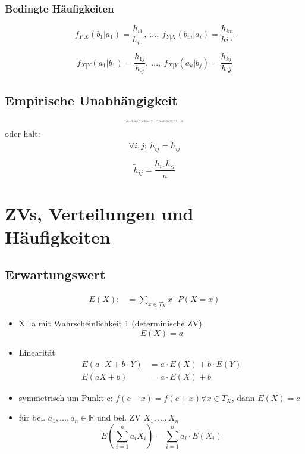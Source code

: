 \documentclass[10pt,a4paper,landscape]{article}
\begin{document}
\begin{multicols}{4}
\subsubsection*{Bedingte Häufigkeiten}

\[
f_{Y|X}(b_1|a_1)=\frac{h_{i1}}{h_{i\cdot}},~...,~ f_{Y|X}(b_m|a_i)=\frac{h_{im}}{h{i\cdot}}
\]

\[
f_{X|Y}(a_1|b_1)=\frac{h_{1j}}{h_{\cdot j}},~...,~ f_{X|Y}(a_k|b_j)=\frac{h_{kj}}{h{\cdot j}}
\]

\subsection{Empirische Unabhängigkeit}
\[ \resizebox{0.2\textwidth}{!}{$
f_{Y|X}(b_j|a_1)=f_Y(b_j|a_2)=...=f_{Y|X}(b_j|a_k)\forall j=1,...,m
$}
\]
oder halt:
\[
\forall i,j: ~ h_{ij}=\tilde{h}_{ij}
\]

\[
\tilde{h}_{ij}=\frac{h_{i \cdot} h_{\cdot j}}{n}
\]


\section{ZVs, Verteilungen und Häufigkeiten}

\subsection{Erwartungswert}
\begin{align*}
E(X) :&=\sum_{x\in T_X} x\cdot P(X=x)
\end{align*}

\begin{itemize}
\item X=a mit Wahrscheinlichkeit 1 (determinische ZV)
\[
E(X)=a
\]
\item Linearität
\begin{align*}
E(a\cdot X + b \cdot Y) &= a\cdot E(X) + b \cdot	E(Y) \\
E(aX+b) &= a\cdot E(X) + b
\end{align*}
\item symmetrisch um Punkt c: $f(c-x)=f(c+x) \forall x \in T_X$, dann $E(X)=c$
\item für bel. $a_1,...,a_n \in \mathbb{R}$ und bel. ZV $X_1,...,X_n$
\[
E\left(\sum_{i=1}^na_iX_i\right)=\sum_{i=1}^na_i \cdot E(X_i)
\]
\end{itemize}


\end{multicols}
\end{document}
